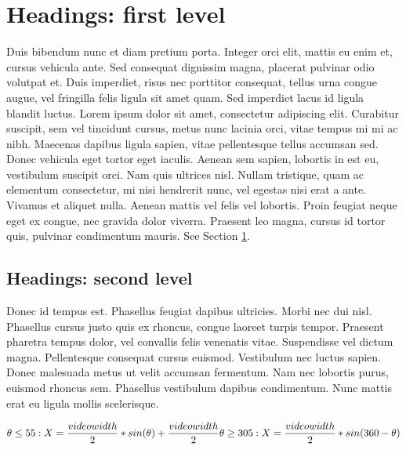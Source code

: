 \documentclass{article}
\begin{document}
\section{Headings: first level}
\label{sec:headings}

Duis bibendum nunc et diam pretium porta. Integer orci elit, mattis eu enim et, cursus vehicula ante. Sed consequat dignissim magna, placerat pulvinar odio volutpat et. Duis imperdiet, risus nec porttitor consequat, tellus urna congue augue, vel fringilla felis ligula sit amet quam. Sed imperdiet lacus id ligula blandit luctus. Lorem ipsum dolor sit amet, consectetur adipiscing elit. Curabitur suscipit, sem vel tincidunt cursus, metus nunc lacinia orci, vitae tempus mi mi ac nibh. Maecenas dapibus ligula sapien, vitae pellentesque tellus accumsan sed. Donec vehicula eget tortor eget iaculis. Aenean sem sapien, lobortis in est eu, vestibulum suscipit orci. Nam quis ultrices nisl. Nullam tristique, quam ac elementum consectetur, mi nisi hendrerit nunc, vel egestas nisi erat a ante. Vivamus et aliquet nulla. Aenean mattis vel felis vel lobortis. Proin feugiat neque eget ex congue, nec gravida dolor viverra. Praesent leo magna, cursus id tortor quis, pulvinar condimentum mauris. See Section \ref{sec:headings}.

\subsection{Headings: second level}
Donec id tempus est. Phasellus feugiat dapibus ultricies. Morbi nec dui nisl. Phasellus cursus justo quis ex rhoncus, congue laoreet turpis tempor. Praesent pharetra tempus dolor, vel convallis felis venenatis vitae. Suspendisse vel dictum magna. Pellentesque consequat cursus euismod. Vestibulum nec luctus sapien. Donec malesuada metus ut velit accumsan fermentum. Nam nec lobortis purus, euismod rhoncus sem. Phasellus vestibulum dapibus condimentum. Nunc mattis erat eu ligula mollis scelerisque. 

\begin{equation} \label{eq1}
  \theta \leq  55:
  X = \frac{video width}{2} * sin(\theta) + \frac{video width}{2}\\
  \\
  \theta \geq 305:
  X = \frac{video width}{2} * sin(360 - \theta)\\
\end{equation}
  
\end{document}
